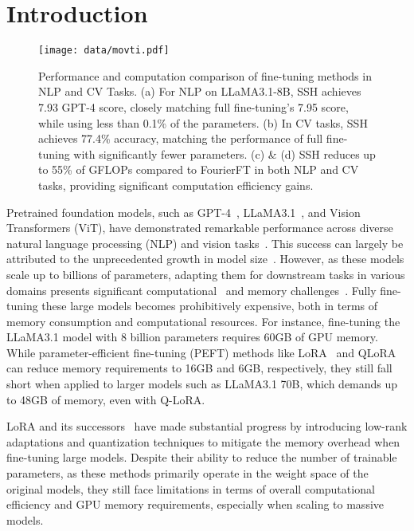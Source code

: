 \section{Introduction}

\begin{figure}[!t]
    \centering
    \texttt{[image: data/movti.pdf]}
    \caption{ \small Performance and computation comparison of fine-tuning methods in NLP and CV Tasks. (a) For NLP on LLaMA3.1-8B, SSH achieves 7.93 GPT-4 score, closely matching full fine-tuning's 7.95 score, while using less than 0.1\% of the parameters. (b) In CV tasks, SSH achieves 77.4\% accuracy, matching the performance of full fine-tuning with significantly fewer parameters. (c) \& (d) SSH reduces up to 55\% of GFLOPs compared to FourierFT in both NLP and CV tasks, providing significant computation efficiency gains.
    }
    \label{fig:mov}
\end{figure}


Pretrained foundation models, such as GPT-4~\cite{islam2024gpt}, LLaMA3.1~\cite{touvron2023llama}, and Vision Transformers (ViT)\cite{dosovitskiy2020image}, have demonstrated remarkable performance across diverse natural language processing (NLP)\cite{huang2024gradient,tao2024robustness,shen2024comparative,shen2024altgen,shen2024parameter} and vision tasks~\cite{huang2025image2text2image,huang2024novel}. 
This success can largely be attributed to the unprecedented growth in model size~\cite{wei2022emergent}. 
However, as these models scale up to billions of parameters, adapting them for downstream tasks in various domains presents significant computational~\cite{shen2023thermal,shen2023thermal1,shen2022tcps,niknam20233d} and memory challenges~\cite{guo2024easter,aghapour2024piqi}. 
Fully fine-tuning these large models becomes prohibitively expensive, both in terms of memory consumption and computational resources. 
For instance, fine-tuning the LLaMA3.1 model with 8 billion parameters requires 60GB of GPU memory. 
While parameter-efficient fine-tuning (PEFT) methods like LoRA~\cite{hu2022lora} and QLoRA~\cite{dettmers2024qlora} can reduce memory requirements to 16GB and 6GB, respectively, they still fall short when applied to larger models such as LLaMA3.1 70B, which demands up to 48GB of memory, even with Q-LoRA.

LoRA and its successors~\cite{lialin2023relora,renduchintala2024tiedlora,liu2024dora} have made substantial progress by introducing low-rank adaptations and quantization techniques to mitigate the memory overhead when fine-tuning large models. 
Despite their ability to reduce the number of trainable parameters, as these methods primarily operate in the weight space of the original models, they still face limitations in terms of overall computational efficiency and GPU memory requirements, especially when scaling to massive models.

